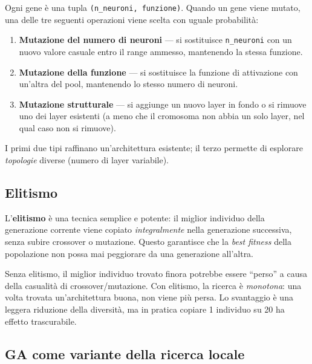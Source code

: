 \documentclass[11pt,a4paper]{article}
\begin{document}
Ogni gene è una tupla \texttt{(n\_neuroni, funzione)}. Quando un gene viene
mutato, una delle tre seguenti operazioni viene scelta con uguale
probabilità:
\begin{enumerate}
    \item \textbf{Mutazione del numero di neuroni} --- si sostituisce
          \texttt{n\_neuroni} con un nuovo valore casuale entro il range
          ammesso, mantenendo la stessa funzione.
    \item \textbf{Mutazione della funzione} --- si sostituisce la funzione
          di attivazione con un'altra del pool, mantenendo lo stesso numero
          di neuroni.
    \item \textbf{Mutazione strutturale} --- si aggiunge un nuovo layer in
          fondo o si rimuove uno dei layer esistenti (a meno che il
          cromosoma non abbia un solo layer, nel qual caso non si rimuove).
\end{enumerate}

I primi due tipi raffinano un'architettura esistente; il terzo permette di
esplorare \emph{topologie} diverse (numero di layer variabile).

\subsection{Elitismo}

L'\textbf{elitismo} è una tecnica semplice e potente: il miglior individuo
della generazione corrente viene copiato \emph{integralmente} nella
generazione successiva, senza subire crossover o mutazione. Questo
garantisce che la \emph{best fitness} della popolazione non possa mai
peggiorare da una generazione all'altra.

\begin{concetto}
Senza elitismo, il miglior individuo trovato finora potrebbe essere
``perso'' a causa della casualità di crossover/mutazione. Con elitismo, la
ricerca è \emph{monotona}: una volta trovata un'architettura buona, non
viene più persa. Lo svantaggio è una leggera riduzione della diversità,
ma in pratica copiare 1 individuo su 20 ha effetto trascurabile.
\end{concetto}

\subsection{GA come variante della ricerca locale}
\end{document}
